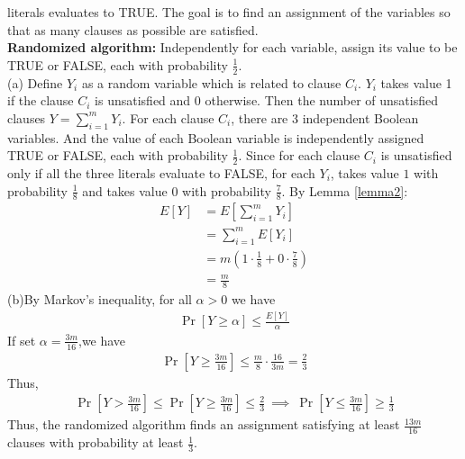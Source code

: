literals evaluates to TRUE. The goal is to find an assignment of the variables so that as many clauses as possible are satisfied.\\
\textbf{Randomized algorithm:} Independently for each variable, assign its value to be TRUE or FALSE, each with probability $\frac{1}{2}$.\\
(a)
Define $Y_i$ as a random variable which is related to clause $C_i$. $Y_i$ takes value 1 if the clause $C_i$ is unsatisfied and 0 otherwise. Then the number of unsatisfied clauses $Y=\sum_{i=1}^{m}Y_i$. For each clause $C_i$, there are $3$ independent Boolean variables. And the value of each Boolean variable is independently assigned TRUE or FALSE, each with probability $\frac{1}{2}$. Since for each clause $C_i$ is unsatisfied only if all the three literals evaluate to FALSE, for each $Y_i$, takes value $1$ with probability $\frac{1}{8}$ and takes value $0$ with probability $\frac{7}{8}$. By Lemma \ref{lemma2}:
\begin{align}
    \nonumber E[Y]&=E[\sum_{i=1}^{m}Y_i]\\
    \nonumber&=\sum_{i=1}^mE[Y_i]\\
    \nonumber&=m(1\cdot \frac{1}{8}+0 \cdot \frac{7}{8})\\
    \nonumber&=\frac{m}{8}
\end{align}
(b)By Markov's inequality, for all $\alpha> 0$ we have
\begin{align}
   \nonumber \Pr[Y\ge \alpha]\le \frac{E[Y]}{\alpha}
\end{align}
If set $\alpha=\frac{3m}{16}$,we have
\begin{align}
    \nonumber \Pr[Y\ge \frac{3m}{16}]\le \frac{m}{8}\cdot \frac{16}{3m}=\frac{2}{3}
\end{align}
Thus, 
\begin{align}
    \nonumber \Pr[Y>\frac{3m}{16}] \le \Pr[Y\ge \frac{3m}{16}]\le \frac{2}{3} ~\implies~\Pr[Y\le \frac{3m}{16}]\ge \frac{1}{3}
\end{align}
Thus, the randomized algorithm finds an assignment satisfying at least $\frac{13m}{16}$ clauses with probability at least $\frac{1}{3}$.\\
